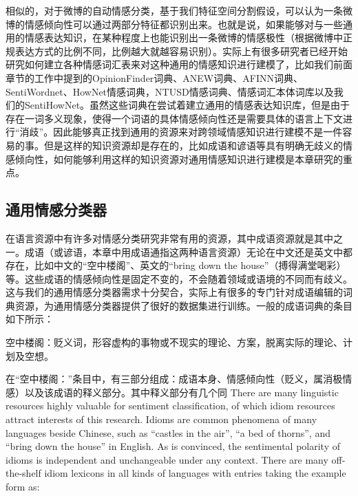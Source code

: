 相似的，对于微博的自动情感分类，基于我们特征空间分割假设，可以认为一条微博的情感倾向性可以通过两部分特征都识别出来。也就是说，如果能够对与一些通用的情感表达知识，在某种程度上也能识别出一条微博的情感极性（根据微博中正规表达方式的比例不同，比例越大就越容易识别）。实际上有很多研究者已经开始研究如何建立各种情感词汇表来对这种通用的情感知识进行建模了，比如我们前面章节的工作中提到的OpinionFinder词典、ANEW词典、AFINN词典、SentiWordnet、HowNet情感词典，NTUSD情感词典、情感词汇本体词库以及我们的SentiHowNet。虽然这些词典在尝试着建立通用的情感表达知识库，但是由于存在一词多义现象，使得一个词语的具体情感倾向性还是需要具体的语言上下文进行“消歧”。因此能够真正找到通用的资源来对跨领域情感知识进行建模不是一件容易的事。但是这样的知识资源却是存在的，比如成语和谚语等具有明确无歧义的情感倾向性，如何能够利用这样的知识资源对通用情感知识进行建模是本章研究的重点。

\subsection{通用情感分类器}
\label{general}
在语言资源中有许多对情感分类研究非常有用的资源，其中成语资源就是其中之一。成语（或谚语，本章中用成语通指这两种语言资源）无论在中文还是英文中都存在，比如中文的“空中楼阁”、英文的``bring down the house''（搏得满堂喝彩）等。这些成语的情感倾向性是固定不变的，不会随着领域或语境的不同而有歧义。这与我们的通用情感分类器需求十分契合，实际上有很多的专门针对成语编辑的词典资源，为通用情感分类器提供了很好的数据集进行训练。一般的成语词典的条目如下所示：
\begin{description}
\item{空中楼阁：}贬义词，形容虚构的事物或不现实的理论、方案，脱离实际的理论、计划及空想。
\end{description}
在“空中楼阁：”条目中，有三部分组成：成语本身、情感倾向性（贬义，属消极情感）以及该成语的释义部分。其中释义部分有几个同
There are many linguistic resources highly valuable for sentiment classification, of which idiom resources attract interests of this research. 
Idioms are common phenomena of many languages beside Chinese, such as ``castles in the air'', ``a bed of thorns'', and ``bring down the house'' in English.
As is convinced, the sentimental polarity of idioms is independent and unchangeable under any context. 
There are many off-the-shelf idiom lexicons in all kinds of languages with entries taking the example form as:

